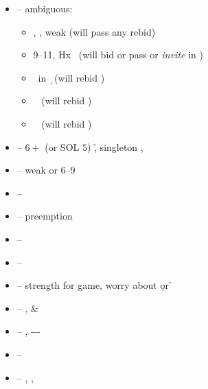 \begin{itemize}
  \item \ctr{2\d} -- ambiguous:
    \begin{itemize}
      \item {}, , weak (will pass any rebid)
      \item 9--11, Hx \s\ (will bid or pass \ctr{2\s} or \emph{invite} in \nt)
      \item \inv\ in \d\ (will rebid \ctr{3\d})
      \item \so\ \ws{\c} (will rebid \ctr{3\c})
      \item \inv\ \ws{\c} (will rebid )
    \end{itemize}
  \item \ctr{2\h} -- $6+$ (or SOL $5$) \h, singleton \s, \so
  \item \ctr{2\s} -- weak \ws{} or 6--9 \wos{}
  \item \ctr{2\nt} -- \inv\ \wos{\c}
  \item \ctr{3\minor/\h} -- preemption
\end{itemize}
\vspace{1em}

\begin{itemize}
  \item \ctr{2\h} -- \so\ \ws{\h}
  \item \ctr{2\s} -- \so\ \wos{\h}
  \item \ctr{2\nt} -- strength for game, worry about \d or \h
  \item \ctr{3\c} -- \gf,  \& 
  \item \ctr{3\d} -- \gf, ---
  \item \ctr{3\h} -- \gf\ \ws{\h}
  \item \ctr{3\s} -- \gf, , 
\end{itemize}
